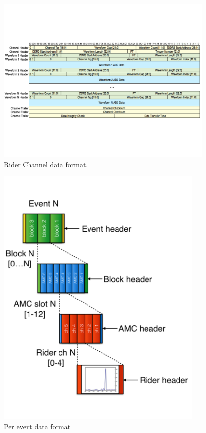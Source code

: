 \documentclass[12pt,letterpaper]{article}
\begin{document}
\begin{figure}[htbp]
\centering
\includegraphics[trim=0cm 5.5cm 0cm 5.5cm ,width=0.95\textwidth]{pics/RiderChannelHeader}
\caption{Rider Channel data format.}
\end{figure}

\begin{figure}[htbp]
\centering
\includegraphics[width=0.9\textwidth]{pics/AllHeaders}
\caption{Per event data format}
\end{figure}
\end{document}
